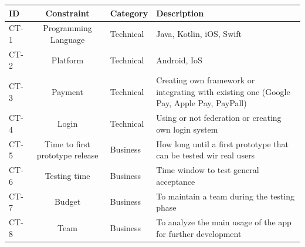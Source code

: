 \begin{table}[htb]
    \begin{tabularx}{\textwidth}{lclX}
        \toprule
        ID & Constraint & Category & Description \\
        \midrule
        CT-1 & Programming Language & Technical & Java, Kotlin, iOS, Swift \\
        CT-2 & Platform & Technical & Android, IoS \\
        CT-3 & Payment & Technical & Creating own framework or integrating with existing one (Google Pay, Apple Pay, PayPall) \\
        CT-4 & Login & Technical & Using or not federation or creating own login system  \\
        CT-5 & Time to first prototype release & Business & How long until a first prototype that can be tested wir real users  \\
        CT-6 & Testing time & Business & Time window to test general acceptance \\
        CT-7 & Budget & Business & To maintain a team during the testing phase \\
        CT-8 & Team & Business & To analyze the main usage of the app for further development \\
        \bottomrule
    \end{tabularx}
\end{table}















